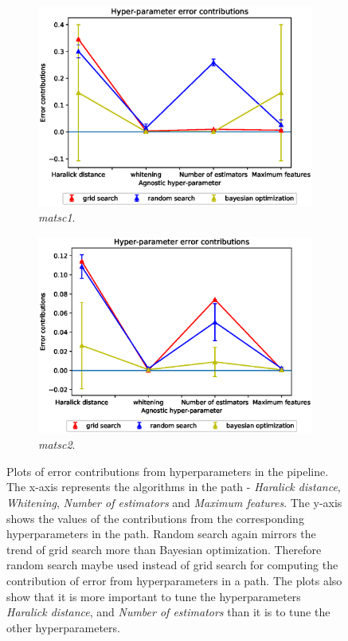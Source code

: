 \begin{figure}[ht!]
\begin{subfigure}{.5\textwidth}
  \includegraphics[scale=0.37]{img/EP/agnostic_error_hyper_matsc_dataset1.eps}
  \caption{\textit{matsc1}.}
  \label{fig:eq_hyper_matsc1}
\end{subfigure}%
\begin{subfigure}{.5\textwidth}
  \centering
  \includegraphics[scale=0.37]{img/EP/agnostic_error_hyper_matsc_dataset2.eps}
  \caption{\textit{matsc2}.}
  \label{fig:eq_hyper_matsc2}
\end{subfigure}

\caption{Plots of error contributions from hyperparameters in the pipeline. The x-axis represents the algorithms in the path - \textit{Haralick distance}, \textit{Whitening}, \textit{Number of estimators} and \textit{Maximum features}. The y-axis shows the values of the contributions from the corresponding hyperparameters in the path. Random search again mirrors the trend of grid search more than Bayesian optimization. Therefore random search maybe used instead of grid search for computing the contribution of error from hyperparameters in a path. The plots also show that it is more important to tune the hyperparameters \textit{Haralick distance}, and \textit{Number of estimators} than it is to tune  the other hyperparameters.}
\label{fig:eq_hyper}
\end{figure}
